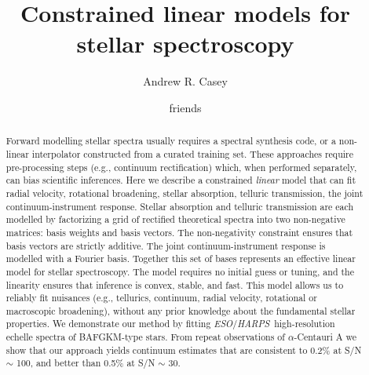 \documentclass[modern]{aastex631}
\newcommand{\chosentitle}{Constrained linear models for stellar spectroscopy}
\newcommand{\project}[1]{\textit{#1}}
\newcommand{\eso}{\project{ESO}}
\newcommand{\harps}{\project{HARPS}}
\begin{document}
\title{\chosentitle}

\author[0000-0003-0174-0564]{Andrew R. Casey}

\author{friends}


\begin{abstract}\noindent
Forward modelling stellar spectra usually requires a spectral synthesis code, or a non-linear interpolator constructed from a curated training set.
These approaches require pre-processing steps (e.g., continuum rectification) which, when performed separately, can bias scientific inferences.
Here we describe a constrained \emph{linear} model that can fit radial velocity, rotational broadening, stellar absorption, telluric transmission, the joint continuum-instrument response.
Stellar absorption and telluric transmission are each modelled by factorizing a grid of rectified theoretical spectra into two non-negative matrices: basis weights and basis vectors.
The non-negativity constraint ensures that basis vectors are strictly additive.
The joint continuum-instrument response is modelled with a Fourier basis.
Together this set of bases represents an effective linear model for stellar spectroscopy.
The model requires no initial guess or tuning, and the linearity ensures that inference is convex, stable, and fast.
This model allows us to reliably fit nuisances (e.g., tellurics, continuum, radial velocity, rotational or macroscopic broadening), without any prior knowledge about the fundamental stellar properties.
We demonstrate our method by fitting \eso/\harps\ high-resolution echelle spectra of BAFGKM-type stars.
From repeat observations of $\alpha$-Centauri A we show that our approach yields continuum estimates that are consistent to 0.2\% at S/N $\sim$ 100, and better than 0.5\% at S/N $\sim$ 30.
\end{abstract}

\end{document}
